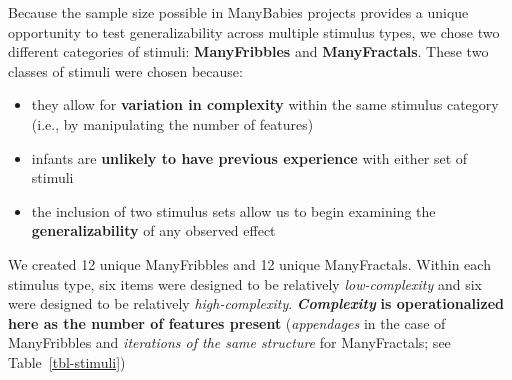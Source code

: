 \documentclass[
  letterpaper,
  DIV=11,
  numbers=noendperiod,
  oneside]{scrreprt}
\providecommand{\tightlist}{%
  \setlength{\itemsep}{0pt}\setlength{\parskip}{0pt}}
\begin{document}
Because the sample size possible in ManyBabies projects provides a
unique opportunity to test generalizability across multiple stimulus
types, we chose two different categories of stimuli:
\textbf{ManyFribbles} and
\textbf{ManyFractals}.
These two classes of stimuli were chosen because:

\begin{itemize}
\tightlist
\item
  they allow for \textbf{variation in complexity} within the same
  stimulus category (i.e., by manipulating the number of features)
\item
  infants are \textbf{unlikely to have previous experience} with either
  set of stimuli
\item
  the inclusion of two stimulus sets allow us to begin examining the
  \textbf{generalizability} of any observed effect
\end{itemize}

We created 12 unique ManyFribbles and 12 unique ManyFractals. Within
each stimulus type, six items were designed to be relatively
\emph{low-complexity} and six were designed to be relatively
\emph{high-complexity}. \textbf{\emph{Complexity}} \textbf{is
operationalized here as the number of features present}
(\emph{appendages} in the case of ManyFribbles and \emph{iterations of
the same structure} for ManyFractals; see Table~\ref{tbl-stimuli})
\end{document}
